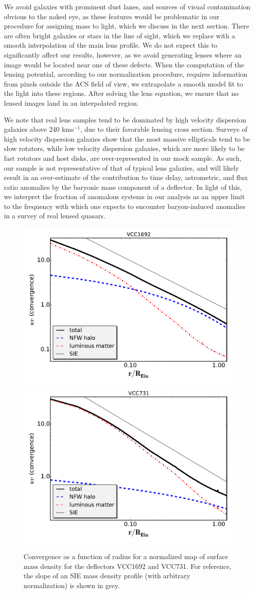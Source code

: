 We avoid galaxies with prominent dust lanes, and sources of visual contamination obvious to the naked eye, as these features would be problematic in our procedure for assigning mass to light, which we discuss in the next section. There are often bright galaxies or stars in the line of sight, which we replace with a smooth interpolation of the main lens profile. We do not expect this to significantly affect our results, however, as we avoid generating lenses where an image would be located near one of these defects. When the computation of the lensing potential, according to our normalization procedure, requires information from pixels outside the ACS field of view, we extrapolate a smooth model fit to the light into these regions. After solving the lens equation, we ensure that no lensed images land in an interpolated region.

We note that real lens samples tend to be dominated by high velocity dispersion galaxies above 240 kms$^{-1}$\cite{Auger++10,Son++13a}, due to their favorable lensing cross section. Surveys of high velocity dispersion galaxies \cite{Goulding++16} show that the most massive ellipticals tend to be slow rotators, while low velocity dispersion galaxies, which are more likely to be fast rotators and host disks, are over-represented in our mock sample. As such, our sample is not representative of that of typical lens galaxies, and will likely result in an over-estimate of the contribution to time delay, astrometric, and flux ratio anomalies by the baryonic mass component of a deflector. In light of this, we interpret the fraction of anomalous systems in our analysis as an upper limit to the frequency with which one expects to encounter baryon-induced anomalies in a survey of real lensed quasars.
\begin{figure}
	\centering
	{\includegraphics[trim=0cm 0.6cm 0cm
		0cm,clip,width=.48\textwidth]{./figures_sls/VCC1692r_vs_kap-eps-converted-to.pdf}}
	{\includegraphics[trim=0cm .6cm 0cm
		0cm,clip,width=.48\textwidth]{./figures_sls/VCC731r_vs_kap-eps-converted-to.pdf}}
	\caption{\label{fig:r_vs_kap}Convergence as a function of radius for a normalized map of surface mass density for the deflectors VCC1692 and VCC731. For reference, the slope of an SIE mass density profile (with arbitrary normalization) is shown in grey.}
\end{figure} 

